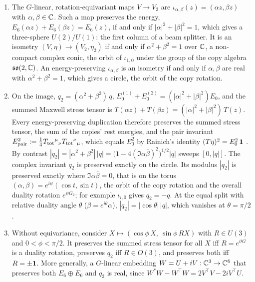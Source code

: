 \begin{theorem}
\label{d5:thm:dup}
\begin{enumerate}[label=(\roman*),leftmargin=2.2em]
\item The $G$-linear, rotation-equivariant maps $V\to V_2$ are $\iota_{\alpha,\beta}(z)=(\alpha z,\beta z)$ with $\alpha,\beta\in\mathbb{C}$. Such a map preserves
the energy, $E_6(\alpha z)+E_6(\beta z)=E_6(z)$, if and only if $|\alpha|^2+|\beta|^2=1$, which gives a three-sphere $U(2)/U(1)$: the first column of
a beam splitter. It is an isometry $(V,\eta)\to(V_2,\eta_2)$ if and only if $\alpha^2+\beta^2=1$ over $\mathbb{C}$, a non-compact complex conic, the orbit
of $\iota_{1,0}$ under the group of the copy algebra $\mathfrak{so}(2,\mathbb{C})$. An energy-preserving $\iota_{\alpha,\beta}$ is an isometry if and only if
$\alpha,\beta$ are real with $\alpha^2+\beta^2=1$, which gives a circle, the orbit of the copy rotation.
\item On the image, $q_2=(\alpha^2+\beta^2)\,q$, $E_0^{(1)}+E_0^{(2)}=(|\alpha|^2+|\beta|^2)E_0$, and the summed Maxwell stress tensor is
$T(\alpha z)+T(\beta z)=(|\alpha|^2+|\beta|^2)\,T(z)$. Every energy-preserving duplication therefore preserves the summed stress tensor, the sum
of the copies' rest energies, and the pair invariant $E_{\rm pair}^2:=\tfrac14T_{\rm tot}{}^\mu{}_\nu T_{\rm tot}{}^\nu{}_\mu$, which equals $E_0^2$ by
Rainich's identity $(T\eta)^2=E_0^2\,\mathbf 1$ \cite{Rainich1925}. By contrast $|q_2|=|\alpha^2+\beta^2|\,|q|=\bigl(1-4(\Im\alpha\bar\beta)^2\bigr)^{1/2}|q|$ sweeps $[0,|q|]$. The complex invariant $q_2$ is preserved exactly on
the circle. Its modulus $|q_2|$ is preserved exactly where $\Im\alpha\bar\beta=0$, that is on the torus $(\alpha,\beta)=e^{i\psi}(\cos t,\sin t)$, the orbit of the copy
rotation and the overall duality rotation $e^{\psi G_2}$; for example $\iota_{i,0}$ gives $q_2=-q$. At the equal split with relative duality angle $\theta$ ($\beta=e^{i\theta}\alpha$), $|q_2|=|\cos\theta|\,|q|$, which vanishes at
$\theta=\pi/2$.
\item Without equivariance, consider $X\mapsto(\cos\phi\,X,\ \sin\phi\,RX)$ with $R\in U(3)$ and $0<\phi<\pi/2$. It preserves the summed stress tensor
for all $X$ iff $R=e^{\vartheta G}$ is a duality rotation, preserves $q_2$ iff $R\in O(3)$, and preserves both iff $R=\pm\mathbf 1$. More generally,
a $G$-linear embedding $W=U+iV:\mathbb{C}^3\to\mathbb{C}^6$ that preserves both $E_6\oplus E_6$ and $q_2$ is real, since
$W^*W-W^{\!\top}W=2V^{\!\top}V-2iV^{\!\top}U$.
\end{enumerate}
\end{theorem}

